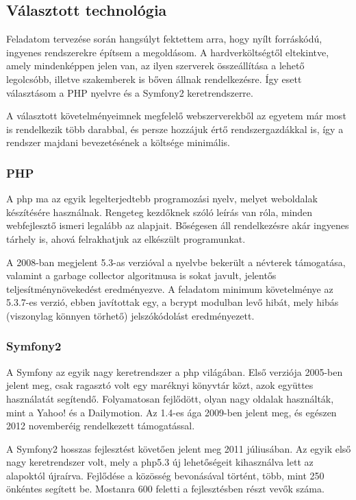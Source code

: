 \documentclass[a4paper,12pt,oneside]{report}
\begin{document}
\subsection{Választott technológia}

Feladatom tervezése során hangsúlyt fektettem arra, hogy nyílt forráskódú, ingyenes rendszerekre építsem a megoldásom. A hardverköltségtől eltekintve, amely mindenképpen jelen van, az ilyen szerverek összeállítása a lehető legolcsóbb, illetve szakemberek is bőven állnak rendelkezésre. Így esett választásom a PHP nyelvre és a Symfony2 keretrendszerre.

A választott követelményeimnek megfelelő webszerverekből az egyetem már most is rendelkezik több darabbal, és persze hozzájuk értő rendszergazdákkal is, így a rendszer majdani bevezetésének a költsége minimális.

\subsubsection{PHP}

A php ma az egyik legelterjedtebb programozási nyelv, melyet weboldalak készítésére használnak. Rengeteg kezdőknek szóló leírás van róla, minden webfejlesztő ismeri legalább az alapjait. Bőségesen áll rendelkezésre akár ingyenes tárhely is, ahová felrakhatjuk az elkészült programunkat.

A 2008-ban megjelent 5.3-as verzióval a nyelvbe bekerült a névterek támogatása, valamint a garbage collector algoritmusa is sokat javult, jelentős teljesítmény\-növe\-kedést eredményezve. A feladatom minimum követelménye az 5.3.7-es verzió, ebben javítottak egy, a bcrypt modulban levő hibát, mely hibás (viszonylag könnyen törhető) jelszókódolást eredményezett.

\subsubsection{Symfony2}

A Symfony az egyik nagy keretrendszer a php világában. Első verziója 2005-ben jelent meg\cite{book:gentle_introduction}, csak ragasztó volt egy maréknyi könyvtár közt, azok együttes használatát segítendő. Folyamatosan fejlődött, olyan nagy oldalak hasz\-nálták, mint a Yahoo!\cite{website:symfony_yahoo} és a Dailymotion\cite{website:symfony_dailymotion}. Az 1.4-es ága 2009-ben jelent meg, és egészen 2012 novemberéig rendelkezett támogatással.

A Symfony2 hosszas fejlesztést követően jelent meg 2011 júliusában. Az egyik első nagy keretrendszer volt, mely a php5.3 új lehetőségeit kihasználva lett az alapoktól újraírva. Fejlődése a közösség bevonásával történt, több, mint 250 önkéntes segített be. Mostanra 600 feletti a fejlesztésben részt vevők száma.
\end{document}
